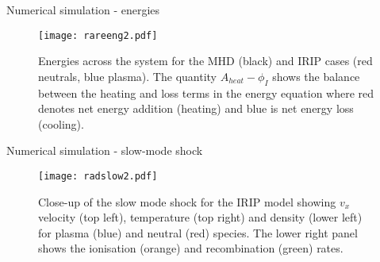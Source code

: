 \documentclass[10pt,aspectratio=169,usenames,dvipsnames]{beamer}
\begin{document}
\begin{frame}{Numerical simulation - energies}
\begin{figure}
    \centering
\texttt{[image: rareeng2.pdf]}
    \caption{Energies across the system for the MHD (black) and IRIP cases (red neutrals, blue plasma). The quantity $A_{heat}- \phi _I$ shows the balance between the heating and loss terms in the energy equation where red denotes net energy addition (heating) and blue is net energy loss (cooling).}
    \label{fig:rareeng}
\end{figure}
\end{frame}

\begin{frame}{Numerical simulation - slow-mode shock}
\begin{figure}
    \centering
\texttt{[image: radslow2.pdf]}
    \caption{Close-up of the slow mode shock for the IRIP model showing $v_x$ velocity (top left), temperature (top right) and density (lower left) for plasma (blue) and neutral (red) species. The lower right panel shows the ionisation (orange) and recombination (green) rates.}
    \label{fig:radslow}
\end{figure}
\end{frame}


\end{document}

